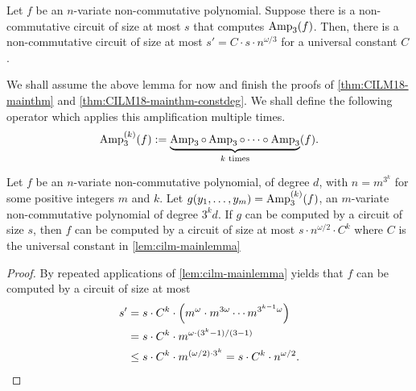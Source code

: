 \begin{lemma}\label{lem:cilm-mainlemma}
Let $f$ be an $n$-variate non-commutative polynomial. Suppose there is a non-commutative circuit of size at most $s$ that computes $\operatorname{Amp}_3(f)$. Then, there is a non-commutative circuit of size at most $s' = C \cdot s \cdot n^{\omega/3}$ for a universal constant $C$. 
\end{lemma}
We shall assume the above lemma for now and finish the proofs of \autoref{thm:CILM18-mainthm} and \autoref{thm:CILM18-mainthm-constdeg}. We shall define the following operator which applies this amplification multiple times. 
\[
  \operatorname{Amp}_3^{(k)}(f) := \underbrace{\operatorname{Amp}_3 \circ \operatorname{Amp}_3 \circ \cdots \circ \operatorname{Amp}_3}_{\text{$k$ times}} (f).\]
\begin{corollary}\label{cor:cilm-maincorr}
  Let $f$ be an $n$-variate non-commutative polynomial, of degree $d$, with $n = m^{3^k}$ for some positive integers $m$ and $k$. Let $g(y_1,\ldots, y_m) = \operatorname{Amp}_3^{(k)}(f)$, an $m$-variate non-commutative polynomial of degree $3^k d$. If $g$ can be computed by a circuit of size $s$, then $f$ can be computed by a circuit of size at most $s \cdot n^{\omega/2}\cdot C^k$ where $C$ is the universal constant in \autoref{lem:cilm-mainlemma}
\end{corollary}
\begin{proof}\belowdisplayskip=-12pt
  By repeated applications of \autoref{lem:cilm-mainlemma} yields that $f$ can be computed by a circuit of size at most
  \begin{align*}
    s' & = s \cdot C^k \cdot \left(m^{\omega} \cdot  m^{3\omega}\cdots m^{3^{k-1}\omega}\right)\\
       & = s \cdot C^k \cdot m^{\omega  \cdot (3^{k} - 1)/(3 - 1)}\\
       & \leq  s \cdot C^k \cdot m^{(\omega/2) \cdot 3^k} = s \cdot C^k \cdot n^{\omega/2}.
  \end{align*}
\end{proof}

